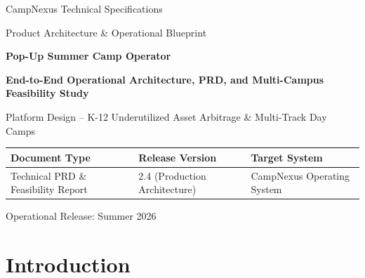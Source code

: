 \documentclass[11pt,a4paper]{article}
\begin{document}
\begin{titlepage}
\begin{center}
\vspace*{1.5cm}

{\large CampNexus Technical Specifications\par}
\vspace{0.3cm}
{\large Product Architecture \& Operational Blueprint\par}

\vspace{2.5cm}

{\Huge \textbf{Pop-Up Summer Camp Operator}\par}
\vspace{0.4cm}
{\LARGE \textbf{End-to-End Operational Architecture, PRD, and Multi-Campus Feasibility Study}\par}

\vspace{1.0cm}
{\large Platform Design -- K-12 Underutilized Asset Arbitrage \& Multi-Track Day Camps\par}

\vspace{2.5cm}

\begin{table}[h!]
\centering
\begin{tabular}{lll}
\toprule
\textbf{Document Type} & \textbf{Release Version} & \textbf{Target System} \\
\midrule
Technical PRD \& Feasibility Report & 2.4 (Production Architecture) & CampNexus Operating System \\
\bottomrule
\end{tabular}
\end{table}

\vfill

{\large Operational Release: Summer 2026\par}
\vspace*{1.0cm}
\end{center}
\end{titlepage}

\newpage
\tableofcontents
\newpage

\section{Introduction}
\end{document}
